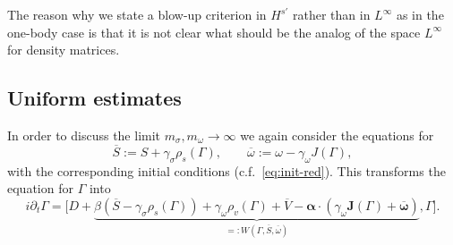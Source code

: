 \documentclass[AHL,Unicode,longabstracts,published]{cedram}
\newcommand\ii{{\ensuremath {\infty}}}
\begin{document}
\begin{rema}
The reason why we state a blow-up criterion in $H^{s'}$ rather than in $L^\ii$ as in the one-body case is that it is not clear what should be the analog of the space $L^\ii$ for density matrices.
\end{rema}

\subsection{Uniform estimates}

In order to discuss the limit $m_\sigma, m_\omega \to \infty$ we again consider the equations for
\begin{equation}\label{eq:def-Sbar-omegabar}
\overline{S}:=S+\gamma_\sigma \rho_s(\Gamma), \qquad \overline{\omega}:=\omega-\gamma_\omega J(\Gamma),
\end{equation}
with the corresponding initial conditions (c.f.~\eqref{eq:init-red}). This transforms the equation for $\Gamma$ into
\begin{equation}\label{eq:Gamma-red}
i\partial_t\Gamma = \Big[D+ \underbrace{{ \beta}\left(\overline{S} -\gamma_\sigma \rho_s(\Gamma)\right) + \gamma_\omega \rho_v(\Gamma) + \overline{V} - {\bm \alpha}\cdot(\gamma_\omega {\bm J}(\Gamma) +\overline{{\bm \omega}}) }_{=:W\left(\Gamma, \overline{S}, \overline{\omega}\right)}, \Gamma \Big].
\end{equation}
\end{document}
